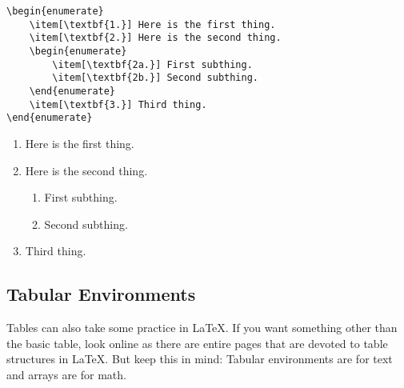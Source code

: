\documentclass[letterpaper,twoside,10pt]{article}
\begin{document}
\begin{multicols}{2}
{\small\begin{verbatim}
\begin{enumerate}
    \item[\textbf{1.}] Here is the first thing.
    \item[\textbf{2.}] Here is the second thing.
    \begin{enumerate}
        \item[\textbf{2a.}] First subthing.
        \item[\textbf{2b.}] Second subthing.
    \end{enumerate}
    \item[\textbf{3.}] Third thing.
\end{enumerate}
\end{verbatim}}
\begin{enumerate}
    \item[\textbf{1.}] Here is the first thing.
    \item[\textbf{2.}] Here is the second thing.
    \begin{enumerate}
        \item[\textbf{2a.}] First subthing.
        \item[\textbf{2b.}] Second subthing.
    \end{enumerate}
    \item[\textbf{3.}] Third thing.
\end{enumerate}
\end{multicols}

\subsection{Tabular Environments}

Tables can also take some practice in {\LaTeX}. If you want something other than the basic table, look online as there are entire pages that are devoted to table structures in {\LaTeX}. But keep this in mind: Tabular environments are for text and arrays are for math.
\end{document}
